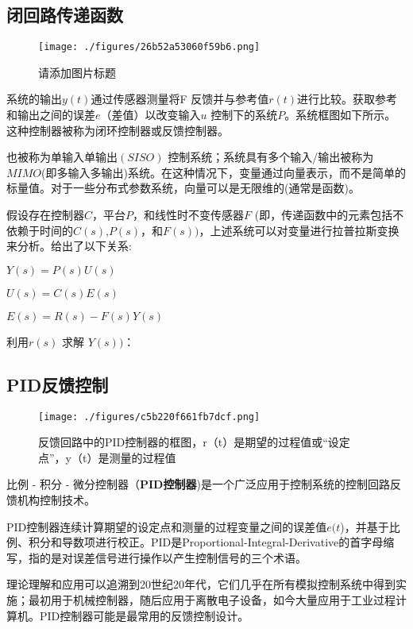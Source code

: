 \subsection{闭回路传递函数}

\begin{figure}[ht]
\centering
\texttt{[image: ./figures/26b52a53060f59b6.png]}
\caption{请添加图片标题} \label{fig_KZLL_2}
\end{figure}

系统的输出$y(t)$通过传感器测量将F 反馈并与参考值$r(t)$进行比较。获取参考和输出之间的误差$e$（差值）以改变输入$u$ 控制下的系统$P$。系统框图如下所示。这种控制器被称为闭环控制器或反馈控制器。

也被称为单输入单输出$(SISO)$ 控制系统；系统具有多个输入/输出被称为$MIMO$(即多输入多输出)系统。在这种情况下，变量通过向量表示，而不是简单的标量值。对于一些分布式参数系统，向量可以是无限维的(通常是函数)。

假设存在控制器$C$，平台$P$，和线性时不变传感器$F$ (即，传递函数中的元素包括不依赖于时间的$C(s)$,$P(s)$，和$F(s))$，上述系统可以对变量进行拉普拉斯变换来分析。给出了以下关系:

$Y(s)=P(s)U(s)$

$U(s)=C(s)E(s)$

$E(s)=R(s)-F(s)Y(s)$

利用$r(s )$ 求解 $Y(s) )$：





\subsection{PID反馈控制}

\begin{figure}[ht]
\centering
\texttt{[image: ./figures/c5b220f661fb7dcf.png]}
\caption{反馈回路中的PID控制器的框图，r（t）是期望的过程值或“设定点”，y（t）是测量的过程值} \label{fig_KZLL_1}
\end{figure}

比例 - 积分 - 微分控制器（\textbf{PID控制器})是一个广泛应用于控制系统的控制回路反馈机构控制技术。

PID控制器连续计算期望的设定点和测量的过程变量之间的误差值$e(t$)，并基于比例、积分和导数项进行校正。PID是Proportional-Integral-Derivative的首字母缩写，指的是对误差信号进行操作以产生控制信号的三个术语。

理论理解和应用可以追溯到20世纪20年代，它们几乎在所有模拟控制系统中得到实施；最初用于机械控制器，随后应用于离散电子设备，如今大量应用于工业过程计算机。PID控制器可能是最常用的反馈控制设计。

